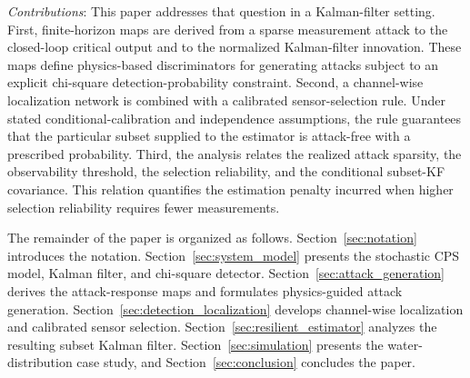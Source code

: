 \emph{Contributions}: This paper addresses that question in a Kalman-filter setting. First, finite-horizon maps are derived from a sparse measurement attack to the closed-loop critical output and to the normalized Kalman-filter innovation. These maps define physics-based discriminators for generating attacks subject to an explicit chi-square detection-probability constraint. Second, a channel-wise localization network is combined with a calibrated sensor-selection rule. Under stated conditional-calibration and independence assumptions, the rule guarantees that the particular subset supplied to the estimator is attack-free with a prescribed probability. Third, the analysis relates the realized attack sparsity, the observability threshold, the selection reliability, and the conditional subset-KF covariance. This relation quantifies the estimation penalty incurred when higher selection reliability requires fewer measurements.

The remainder of the paper is organized as follows. Section~\ref{sec:notation} introduces the notation. Section~\ref{sec:system_model} presents the stochastic CPS model, Kalman filter, and chi-square detector. Section~\ref{sec:attack_generation} derives the attack-response maps and formulates physics-guided attack generation. Section~\ref{sec:detection_localization} develops channel-wise localization and calibrated sensor selection. Section~\ref{sec:resilient_estimator} analyzes the resulting subset Kalman filter. Section~\ref{sec:simulation} presents the water-distribution case study, and Section~\ref{sec:conclusion} concludes the paper.
